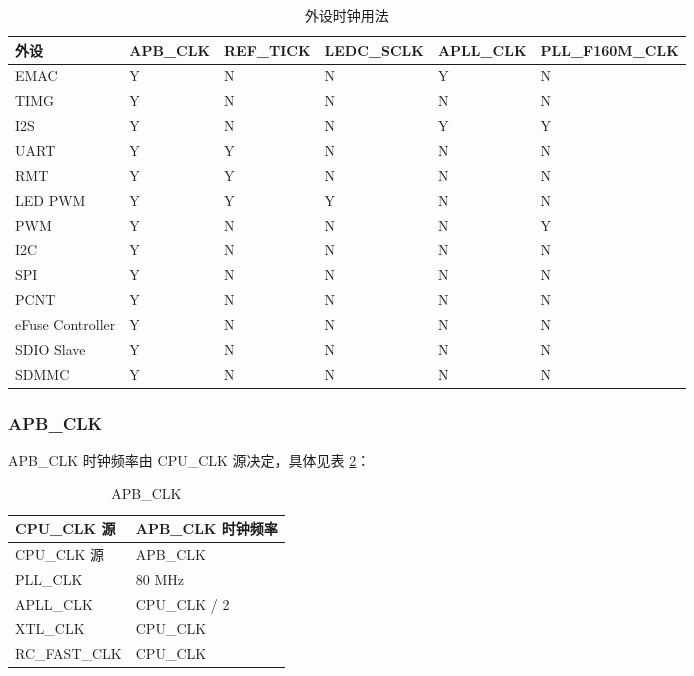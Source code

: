 \documentclass[main\_\_CN.tex]{subfiles}
\begin{document}
\begin{longtable}[c]{ |l|l|l|l|l|l| }
 \caption{外设时钟用法}
    \label{table:peri clk owner}
        \\\hline
        \rowcolor{lightgray}
        外设 & APB\_CLK & REF\_TICK & LEDC\_SCLK & APLL\_CLK & PLL\_F160M\_CLK\\
        \hline
        EMAC & Y & N & N & Y & N \\
        \hline
        TIMG & Y & N & N & N & N \\
        \hline
        I2S & Y & N & N & Y & Y \\
        \hline
        UART & Y & Y & N & N & N \\
        \hline
        RMT & Y & Y & N & N & N \\
        \hline
        LED PWM & Y & Y & Y & N & N \\
        \hline
        PWM & Y & N & N & N & Y \\
        \hline
        I2C & Y & N & N & N & N \\
        \hline
        SPI & Y & N & N & N & N \\
        \hline
        PCNT & Y & N & N & N & N \\
        \hline
        eFuse Controller & Y & N & N & N & N \\
        \hline
        SDIO Slave & Y & N & N & N & N \\
        \hline
        SDMMC & Y & N & N & N & N \\
        \hline
    \end{longtable}

\vspace{-2em}
\subsubsection{APB\_CLK}

APB\_CLK 时钟频率由 CPU\_CLK 源决定，具体见表 \ref{table:apb_clk_src}：

\begin{longtable}[c]{|l|l|}
      \caption{APB\_CLK}
    \label{table:apb_clk_src}
        \\\hline
        \rowcolor{lightgray}
        CPU\_CLK 源 & APB\_CLK 时钟频率\\
        \hline
        \endfirsthead
        \hline
        \rowcolor{lightgray}
        CPU\_CLK 源 & APB\_CLK \\
        \hline
        \endhead
        \endfoot
        PLL\_CLK & 80 MHz \\
        \hline
        APLL\_CLK & CPU\_CLK / 2 \\
        \hline
        XTL\_CLK & CPU\_CLK \\
        \hline
        RC\_FAST\_CLK & CPU\_CLK \\
        \hline
\end{longtable}
\end{document}
